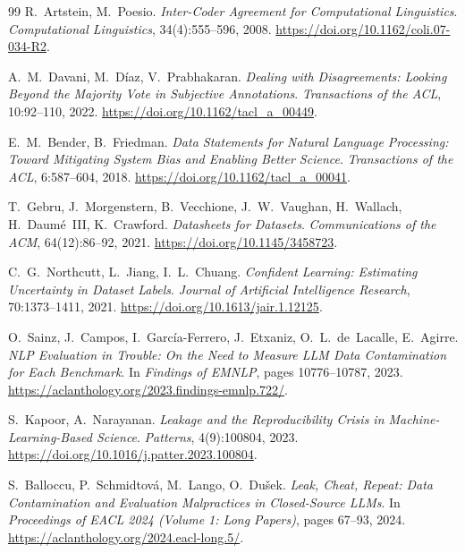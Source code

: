 \documentclass[11pt,a4paper]{article}
\begin{document}
\begin{thebibliography}{99}
R.~Artstein, M.~Poesio.
\newblock \emph{Inter-Coder Agreement for Computational Linguistics}.
\newblock \emph{Computational Linguistics}, 34(4):555--596, 2008.
\newblock \url{https://doi.org/10.1162/coli.07-034-R2}.

A.~M.~Davani, M.~D\'iaz, V.~Prabhakaran.
\newblock \emph{Dealing with Disagreements: Looking Beyond the Majority Vote in Subjective Annotations}.
\newblock \emph{Transactions of the ACL}, 10:92--110, 2022.
\newblock \url{https://doi.org/10.1162/tacl_a_00449}.

E.~M.~Bender, B.~Friedman.
\newblock \emph{Data Statements for Natural Language Processing: Toward Mitigating System Bias and Enabling Better Science}.
\newblock \emph{Transactions of the ACL}, 6:587--604, 2018.
\newblock \url{https://doi.org/10.1162/tacl_a_00041}.

T.~Gebru, J.~Morgenstern, B.~Vecchione, J.~W.~Vaughan, H.~Wallach,
H.~Daum\'e~III, K.~Crawford.
\newblock \emph{Datasheets for Datasets}.
\newblock \emph{Communications of the ACM}, 64(12):86--92, 2021.
\newblock \url{https://doi.org/10.1145/3458723}.

C.~G.~Northcutt, L.~Jiang, I.~L.~Chuang.
\newblock \emph{Confident Learning: Estimating Uncertainty in Dataset Labels}.
\newblock \emph{Journal of Artificial Intelligence Research}, 70:1373--1411, 2021.
\newblock \url{https://doi.org/10.1613/jair.1.12125}.

O.~Sainz, J.~Campos, I.~Garc\'ia-Ferrero, J.~Etxaniz,
O.~L.~de~Lacalle, E.~Agirre.
\newblock \emph{NLP Evaluation in Trouble: On the Need to Measure LLM Data Contamination for Each Benchmark}.
\newblock In \emph{Findings of EMNLP}, pages 10776--10787, 2023.
\newblock \url{https://aclanthology.org/2023.findings-emnlp.722/}.

S.~Kapoor, A.~Narayanan.
\newblock \emph{Leakage and the Reproducibility Crisis in Machine-Learning-Based Science}.
\newblock \emph{Patterns}, 4(9):100804, 2023.
\newblock \url{https://doi.org/10.1016/j.patter.2023.100804}.

S.~Balloccu, P.~Schmidtov\'a, M.~Lango, O.~Du\v{s}ek.
\newblock \emph{Leak, Cheat, Repeat: Data Contamination and Evaluation Malpractices in Closed-Source LLMs}.
\newblock In \emph{Proceedings of EACL 2024 (Volume 1: Long Papers)}, pages 67--93, 2024.
\newblock \url{https://aclanthology.org/2024.eacl-long.5/}.


\end{thebibliography}
\end{document}
